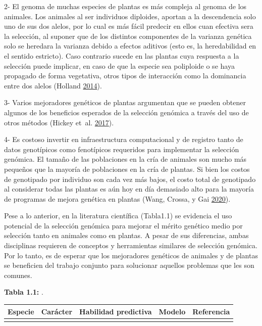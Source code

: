 \documentclass[11pt,spanish,a4paper,oneside,]{book} %
\begin{document}
2- El genoma de muchas especies de plantas es más compleja al genoma de los animales. Los animales al ser individuos diploides, aportan a la descendencia solo uno de sus dos alelos, por lo cual es más fácil predecir en ellos cuan efectiva sera la selección, al suponer que de los distintos componentes de la varianza genética solo se heredara la varianza debido a efectos aditivos (esto es, la heredabilidad en el sentido estricto). Caso contrario sucede en las plantas cuya respuesta a la selección puede implicar, en caso de que la especie sea poliploide o se haya propagado de forma vegetativa, otros tipos de interacción como la dominancia entre dos alelos (Holland \protect\hyperlink{ref-cite:43}{2014}).

3- Varios mejoradores genéticos de plantas argumentan que se pueden obtener algunos de los beneficios esperados de la selección genómica a través del uso de otros métodos (Hickey et~al. \protect\hyperlink{ref-cite:44}{2017}).

4- Es costoso invertir en infraestructura computacional y de registro tanto de datos genotípicos como fenotípicos requeridos para implementar la selección genómica. El tamaño de las poblaciones en la cría de animales son mucho más pequeños que la mayoría de poblaciones en la cría de plantas. Si bien los costos de genotipado por individuo son cada vez más bajos, el costo total de genotipado al considerar todas las plantas es aún hoy en día demasiado alto para la mayoría de programas de mejora genética en plantas (Wang, Crossa, y Gai \protect\hyperlink{ref-cite:46}{2020}).

Pese a lo anterior, en la literatura científica (Tabla1.1) se evidencia el uso potencial de la selección genómica para mejorar el mérito genético medio por selección tanto en animales como en plantas. A pesar de sus diferencias, ambas disciplinas requieren de conceptos y herramientas similares de selección genómica. Por lo tanto, es de esperar que los mejoradores genéticos de animales y de plantas se beneficien del trabajo conjunto para solucionar aquellos problemas que les son comunes.

\begin{center}
\textbf{Tabla 1.1:} .

\end{center}

\captionsetup[table]{labelformat=empty,skip=1pt}
\begin{longtable}{lllll}
\toprule
Especie & Carácter & Habilidad predictiva & Modelo & Referencia \\ 
\midrule
 &  &  &  &  \\ 
 \bottomrule
\end{longtable}
\end{document}
